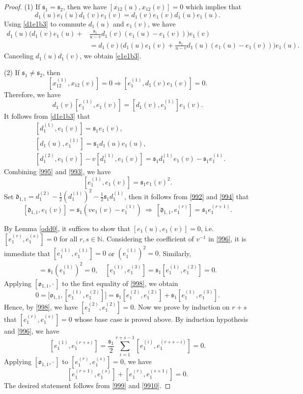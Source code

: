\documentclass[11pt,reqno]{amsart}
\numberwithin{equation}{section}
\theoremstyle{definition}
\theoremstyle{remark}
\newcommand{\beq}{\begin{equation}}
\newcommand{\eeq}{\end{equation}}
\newcommand{\be}{\begin{equation*}}
\newcommand{\ee}{\end{equation*}}
\newcommand{\bN}{\mathbb{N}}
\newcommand{\ka}{{\mathfrak s}}
\begin{document}
\begin{proof}
(1) If $\ka_1=\ka_2$, then we have $[x_{12}(u),x_{12}(v)]=0$ which implies that
\be 
d_1(u) e_1(u)d_1(v) e_1(v)=d_1(v)  e_1(v)d_1(u) e_1(u).
\ee 
Using \eqref{d1e1b3} to commute $d_1(u)$ and $e_1(v)$, we have
\begin{align*}
d_1(u)\Big(d_1(v)e_1(u)+&\frac{\ka_1}{u-v}d_1(v)(e_1(u)-e_1(v))\Big)e_1(v)\\
&=d_1(v)\Big(d_1(u)e_1(v)+\frac{\ka_1}{u-v}d_1(u)(e_1(u)-e_1(v))\Big)e_1(u).
\end{align*}
Canceling $d_1(u)d_1(v)$, we obtain \eqref{e1e1b3}.

(2) If $\ka_1\ne \ka_2$, then 
\beq\label{b3pf2}
[x_{12}^{(1)},x_{12}(v)]=0\Longrightarrow [e_1^{(1)},d_1(v)e_{1}(v)]=0.
\eeq
Therefore, we have
\beq\label{995}
d_1(v)[e_1^{(1)},e_1(v)]=[d_1(v),e_1^{(1)}]e_1(v).
\eeq
It follows from \eqref{d1e1b3} that 
\begin{align}
&[d_1^{(1)},e_1(v)]=\ka_1 e_1(v),\label{992}\\
&[d_1(u),e_1^{(1)}]=\ka_1d_1(u)e_1(u),\label{993}\\
&[d_1^{(2)},e_1(v)]-v[d_1^{(1)},e_1(v)]=\ka_1 d_1^{(1)}e_1(v)-\ka_1 e_1^{(1)}.\label{994}
\end{align}
Combining \eqref{995} and \eqref{993}, we have
\beq\label{996}
[e_1^{(1)},e_1(v)]=\ka_1e_1(v)^2.
\eeq
Set $\mathfrak{d}_{1,1}=d_1^{(2)}-\frac12 (d_{1}^{(1)})^2-\frac{1}{2}\ka_1d_1^{(1)}$, then it follows from \eqref{992} and \eqref{994} that
\beq\label{997}
[\mathfrak{d}_{1,1},e_1(v)]=\ka_1(ve_1(v)-e_1^{(1)})~\Longrightarrow ~[\mathfrak{d}_{1,1},e_1^{(r)}]=\ka_1e_1^{(r+1)}.
\eeq

By Lemma \ref{odd0}, it suffices to show that $[e_1(u),e_1(v)]=0$, i.e. $[e_1^{(r)},e_1^{(s)}]=0$ for all $r,s\in\bN$. Considering the coefficient of $v^{-1}$ in \eqref{996}, it is immediate that $[e_1^{(1)},e_1^{(1)}]=0$ or $(e_1^{(1)})^2=0$. Similarly,
\begin{align}
[e_1^{(1)},e_1^{(2)}]=\ka_1 (e_1^{(1)})^2=0,\quad [e_1^{(1)},e_1^{(3)}]=\ka_1 [e_1^{(1)},e_1^{(2)}]=0.\label{998}
\end{align}
Applying $[\mathfrak{o}_{1,1},\cdot\,]$ to the first equality of \eqref{998}, we obtain
\[
0=\big[\mathfrak{o}_{1,1},[e_1^{(1)},e_1^{(2)}]\big]=\ka_1[e_1^{(2)},e_1^{(2)}]+\ka_1[e_1^{(1)},e_1^{(3)}].
\]
Hence, by \eqref{998}, we have $[e_1^{(2)},e_1^{(2)}]=0$. Now we prove by induction on $r+s$ that $[e_1^{(r)},e_1^{(s)}]=0$ whose base case is proved above. By induction hypothesis and \eqref{996}, we have
\beq\label{999}
[e_1^{(1)},e_1^{(r+s)}]=\frac{\ka_1}{2}\sum_{i=1}^{r+s-1}[e_1^{(i)},e_1^{(r+s-i)}]=0.
\eeq
Applying $[\mathfrak{o}_{1,1},\cdot\,]$ to $[e_1^{(r)},e_1^{(s)}]=0$, we have
\beq\label{9910}
[e_1^{(r+1)},e_1^{(s)}]+[e_1^{(r)},e_1^{(s+1)}]=0.
\eeq
The desired statement follows from \eqref{999} and \eqref{9910}.


\end{proof}
\end{document}
